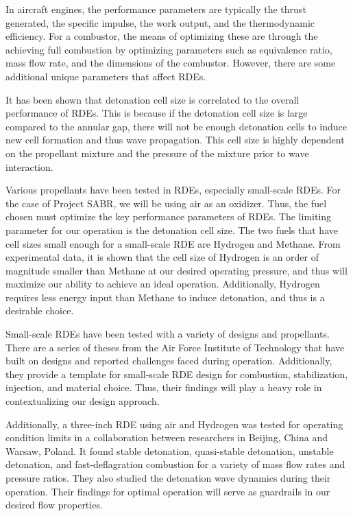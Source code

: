 In aircraft engines, the performance parameters are typically the thrust generated, the specific impulse, the work output, and the thermodynamic efficiency. For a combustor, the means of optimizing these are through the achieving full combustion by optimizing parameters such as equivalence ratio, mass flow rate, and the dimensions of the combustor. However, there are some additional unique parameters that affect RDEs.

It has been shown that detonation cell size is correlated to the overall performance of RDEs. This is because if the detonation cell size is large compared to the annular gap, there will not be enough detonation cells to induce new cell formation and thus wave propagation. This cell size is highly dependent on the propellant mixture and the pressure of the mixture prior to wave interaction.

Various propellants have been tested in RDEs, especially small-scale RDEs. For the case of Project SABR, we will be using air as an oxidizer. Thus, the fuel chosen must optimize the key performance parameters of RDEs. The limiting parameter for our operation is the detonation cell size. The two fuels that have cell sizes small enough for a small-scale RDE are Hydrogen and Methane. From experimental data, it is shown that the cell size of Hydrogen is an order of magnitude smaller than Methane at our desired operating pressure, and thus will maximize our ability to achieve an ideal operation. Additionally, Hydrogen requires less energy input than Methane to induce detonation, and thus is a desirable choice.

Small-scale RDEs have been tested with a variety of designs and propellants. There are a series of theses from the Air Force Institute of Technology that have built on designs and reported challenges faced during operation. Additionally, they provide a template for small-scale RDE design for combustion, stabilization, injection, and material choice. Thus, their findings will play a heavy role in contextualizing our design approach.

Additionally, a three-inch RDE using air and Hydrogen was tested for operating condition limits in a collaboration between researchers in Beijing, China and Warsaw, Poland. It found stable detonation, quasi-stable detonation, unstable detonation, and fast-deflagration combustion for a variety of mass flow rates and pressure ratios. They also studied the detonation wave dynamics during their operation. Their findings for optimal operation will serve as guardrails in our desired flow properties.

